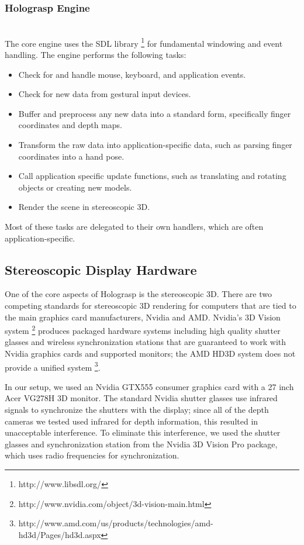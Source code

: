 \documentclass[pageno]{jpaper}
\begin{document}
\subsubsection{Holograsp Engine}$ $\\
The core engine uses the SDL library \footnote{http://www.libsdl.org/} for fundamental windowing and event handling.
The engine performs the following tasks:
\begin{itemize}
\item Check for and handle mouse, keyboard, and application events.
\item Check for new data from gestural input devices.
\item Buffer and preprocess any new data into a standard form, specifically finger coordinates and depth maps.
\item Transform the raw data into application-specific data, such as parsing finger coordinates into a hand pose.
\item Call application specific update functions, such as translating and rotating objects or creating new models.
\item Render the scene in stereoscopic 3D.
\end{itemize}

Most of these tasks are delegated to their own handlers, which are often application-specific.

\subsection{Stereoscopic Display Hardware}
One of the core aspects of Holograsp is the stereoscopic 3D. There are two competing standards for stereoscopic 3D rendering for computers
that are tied to the main graphics card manufacturers, Nvidia and AMD. Nvidia's 3D Vision system \footnote{http://www.nvidia.com/object/3d-vision-main.html}
produces packaged hardware systems including high quality shutter glasses and wireless synchronization stations that are guaranteed to work with Nvidia
graphics cards and supported monitors; the AMD HD3D system does not provide a unified system \footnote{http://www.amd.com/us/products/technologies/amd-hd3d/Pages/hd3d.aspx}.

In our setup, we used an Nvidia GTX555 consumer graphics card with a 27 inch Acer VG278H 3D monitor. The standard Nvidia shutter glasses use infrared
signals to synchronize the shutters with the display; since all of the depth cameras we tested used infrared for depth information, this resulted in
unacceptable interference. To eliminate this interference, we used the shutter glasses and synchronization station from the Nvidia 3D Vision Pro
package, which uses radio frequencies for synchronization.
\end{document}
